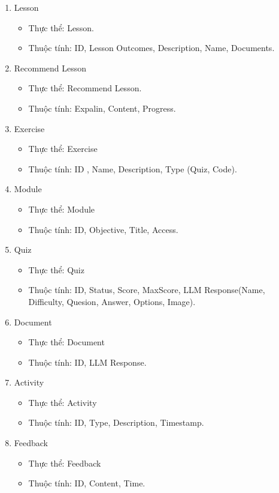 \begin{enumerate}
    \item Lesson
    \begin{itemize}
        \item Thực thể: Lesson.
        \item Thuộc tính: ID, Lesson Outcomes, Description, Name, Documents.
    \end{itemize}
    \item Recommend Lesson
    \begin{itemize}
        \item Thực thể: Recommend Lesson.
        \item Thuộc tính: Expalin, Content, Progress.
    \end{itemize}
    \item Exercise
    \begin{itemize}
        \item Thực thể: Exercise
        \item Thuộc tính: ID , Name, Description, Type (Quiz, Code).
    \end{itemize}
    \item Module
    \begin{itemize}
        \item Thực thể: Module
        \item Thuộc tính: ID, Objective, Title, Access.
    \end{itemize}
    \item Quiz
    \begin{itemize}
        \item Thực thể: Quiz
        \item Thuộc tính: ID, Status, Score, MaxScore, LLM Response(Name, Difficulty, Quesion, Answer, Options, Image).
    \end{itemize}
    \item Document
     \begin{itemize}
        \item Thực thể: Document
        \item Thuộc tính: ID, LLM Response.
    \end{itemize}
    \item Activity
     \begin{itemize}
        \item Thực thể: Activity    
        \item Thuộc tính: ID, Type, Description, Timestamp.
    \end{itemize}
    \item Feedback
     \begin{itemize}
        \item Thực thể: Feedback    
        \item Thuộc tính: ID, Content, Time.
    \end{itemize}
\end{enumerate}
